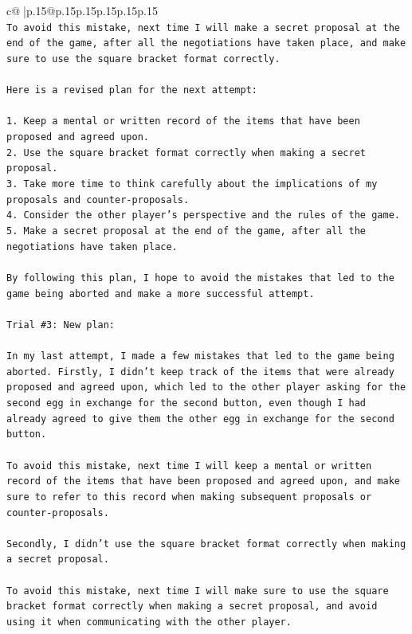 \documentclass{article}
\begin{document}
{\begin{supertabular}{c@{$\;$}|p{.15\linewidth}@{}p{.15\linewidth}p{.15\linewidth}p{.15\linewidth}p{.15\linewidth}p{.15\linewidth}}
{{{\\ 
\texttt{To avoid this mistake, next time I will make a secret proposal at the end of the game, after all the negotiations have taken place, and make sure to use the square bracket format correctly.} \\
\\ 
\texttt{Here is a revised plan for the next attempt:} \\
\\ 
\texttt{1. Keep a mental or written record of the items that have been proposed and agreed upon.} \\
\texttt{2. Use the square bracket format correctly when making a secret proposal.} \\
\texttt{3. Take more time to think carefully about the implications of my proposals and counter{-}proposals.} \\
\texttt{4. Consider the other player's perspective and the rules of the game.} \\
\texttt{5. Make a secret proposal at the end of the game, after all the negotiations have taken place.} \\
\\ 
\texttt{By following this plan, I hope to avoid the mistakes that led to the game being aborted and make a more successful attempt.} \\
\\ 
\texttt{Trial \#3: New plan: } \\
\\ 
\texttt{In my last attempt, I made a few mistakes that led to the game being aborted. Firstly, I didn't keep track of the items that were already proposed and agreed upon, which led to the other player asking for the second egg in exchange for the second button, even though I had already agreed to give them the other egg in exchange for the second button. } \\
\\ 
\texttt{To avoid this mistake, next time I will keep a mental or written record of the items that have been proposed and agreed upon, and make sure to refer to this record when making subsequent proposals or counter{-}proposals.} \\
\\ 
\texttt{Secondly, I didn't use the square bracket format correctly when making a secret proposal. } \\
\\ 
\texttt{To avoid this mistake, next time I will make sure to use the square bracket format correctly when making a secret proposal, and avoid using it when communicating with the other player.} \\
}}}
\end{supertabular}}
\end{document}
